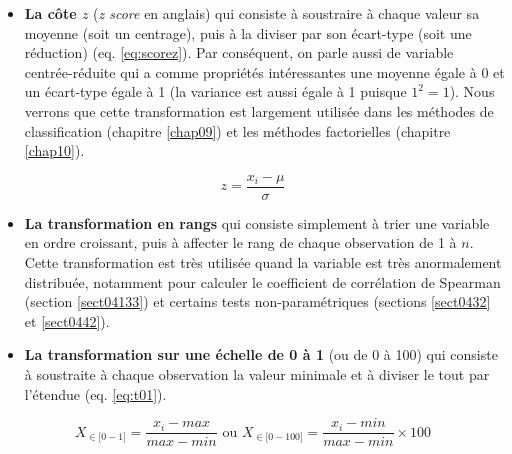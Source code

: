 \documentclass[
  11pt,
  french,
]{book}
\providecommand{\tightlist}{%
  \setlength{\itemsep}{0pt}\setlength{\parskip}{0pt}}
\begin{document}
\begin{itemize}
\tightlist
\item
  \textbf{La côte \(z\)} (\emph{z score} en anglais) qui consiste à soustraire à chaque valeur sa moyenne (soit un centrage), puis à la diviser par son écart-type (soit une réduction) (eq. \eqref{eq:scorez}). Par conséquent, on parle aussi de variable centrée-réduite qui a comme propriétés intéressantes une moyenne égale à 0 et un écart-type égale à 1 (la variance est aussi égale à 1 puisque \(1^2=1\)). Nous verrons que cette transformation est largement utilisée dans les méthodes de classification (chapitre \ref{chap09}) et les méthodes factorielles (chapitre \ref{chap10}).
\end{itemize}

\footnotesize

\begin{equation}  
z= \frac{x_i-\mu}{\sigma}
\label{eq:scorez}
\end{equation}
\normalsize

\begin{itemize}
\item
  \textbf{La transformation en rangs} qui consiste simplement à trier une variable en ordre croissant, puis à affecter le rang de chaque observation de 1 à \(n\). Cette transformation est très utilisée quand la variable est très anormalement distribuée, notamment pour calculer le coefficient de corrélation de Spearman (section \ref{sect04133}) et certains tests non-paramétriques (sections \ref{sect0432} et \ref{sect0442}).
\item
  \textbf{La transformation sur une échelle de 0 à 1} (ou de 0 à 100) qui consiste à soustraite à chaque observation la valeur minimale et à diviser le tout par l'étendue (eq. \eqref{eq:t01}).
\end{itemize}

\footnotesize

\begin{equation}  
X_{\in\lbrack0-1\rbrack}= \frac{x_i-max}{max-min} \text{ ou } X_{\in\lbrack0-100\rbrack}= \frac{x_i-min}{max-min}\times100
\label{eq:t01}
\end{equation}
\normalsize
\end{document}
